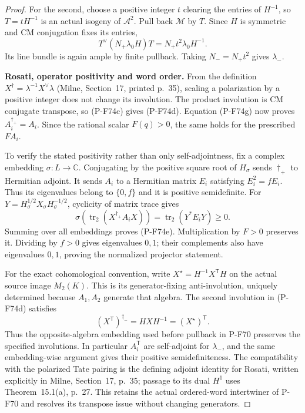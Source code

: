 \begin{proof}
For the second, choose a positive integer $t$ clearing the entries of
$H^{-1}$, so $T=tH^{-1}$ is an actual isogeny of
$\mathcal A^2$.  Pull back $\mathcal M$ by $T$.
Since $H$ is symmetric and CM conjugation fixes its entries,
\[
 T^\vee(N_+\lambda_0H)T
                       =N_+t^2\lambda_0H^{-1}.
\]
Its line bundle is again ample by finite pullback.
Taking $N_-=N_+t^2$ gives $\lambda_-$.

\par\medskip\noindent\textbf{Rosati, operator positivity and word order.}
From the definition $X^\dagger=\lambda^{-1}X^\vee\lambda$
(Milne, Section~17, printed p.~35), scaling a polarization
by a positive integer does not change its involution.
The product involution is CM conjugate transpose, so
(P-F74c) gives (P-F74d).  Equation (P-F74g) now proves
$A_i^{\dagger_+}=A_i$.  Since the rational scalar $F(q)>0$,
the same holds for the prescribed $FA_i$.

To verify the stated positivity rather than only
self-adjointness, fix a complex embedding $\sigma:L\to\mathbb C$.
Conjugating by the positive square root of $H_\sigma$ sends
$\dagger_+$ to Hermitian adjoint.  It sends $A_i$ to a
Hermitian matrix $E_i$ satisfying $E_i^2=fE_i$.
Thus its eigenvalues belong to $\{0,f\}$ and it is
positive semidefinite.  For
$Y=H_\sigma^{1/2}X_\sigma H_\sigma^{-1/2}$, cyclicity of
matrix trace gives
\[
 \sigma\!\left(\operatorname{tr}_2(X^{\dagger_+}A_iX)\right)
                         =\operatorname{tr}_2(Y^*E_iY)\ge0.
                                                               \tag{P-F74m}
\]
Summing over all embeddings proves (P-F74e).
Multiplication by $F>0$ preserves it.  Dividing by $f>0$
gives eigenvalues $0,1$; their complements also have
eigenvalues $0,1$, proving the normalized projector statement.

For the exact cohomological convention, write
$X^\star=H^{-1}X^{\mathsf T}H$ on the actual source image
$M_2(K)$.  This is its generator-fixing anti-involution,
uniquely determined because $A_1,A_2$ generate that algebra.
The second involution in (P-F74d) satisfies
\[
               (X^{\mathsf T})^{\dagger_-}
                      =H XH^{-1}=(X^\star)^{\mathsf T}.
                                                               \tag{P-F74n}
\]
Thus the opposite-algebra embedding used before pullback
in P-F70 preserves the specified involutions.  In particular
$A_i^{\mathsf T}$ are self-adjoint for $\lambda_-$, and the
same embedding-wise argument gives their positive
semidefiniteness.  The compatibility with the polarized
Tate pairing is the defining adjoint identity for Rosati,
written explicitly in Milne, Section~17, p.~35; passage to
its dual $H^1$ uses Theorem~15.1(a), p.~27.
This retains the actual ordered-word intertwiner of P-F70
and resolves its transpose issue without changing generators.
\end{proof}

